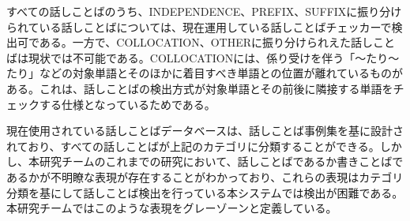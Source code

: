 すべての話しことばのうち、INDEPENDENCE、PREFIX、SUFFIXに振り分けられている話しことばについては、現在運用している話しことばチェッカーで検出可である。一方で、COLLOCATION、OTHERに振り分けられえた話しことばは現状では不可能である。COLLOCATIONには、係り受けを伴う「～たり～たり」などの対象単語とそのほかに着目すべき単語との位置が離れているものがある。これは、話しことばの検出方式が対象単語とその前後に隣接する単語をチェックする仕様となっているためである。

現在使用されている話しことばデータベースは、話しことば事例集を基に設計されており、すべての話しことばが上記のカテゴリに分類することができる。しかし、本研究チームのこれまでの研究において、話しことばであるか書きことばであるかが不明瞭な表現が存在することがわかっており、これらの表現はカテゴリ分類を基にして話しことば検出を行っている本システムでは検出が困難である。本研究チームではこのような表現をグレーゾーンと定義している。
